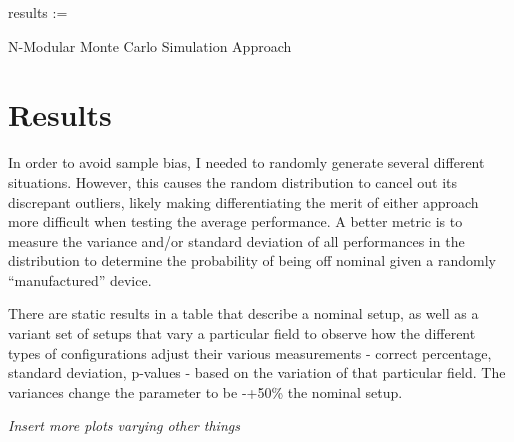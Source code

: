 \documentclass[article]{IEEEtran}
\begin{document}
\begin{algorithm}
    results := 
    \caption{N-Modular Monte Carlo Simulation Approach}
\end{algorithm}

\section{Results}
In order to avoid sample bias, I needed to randomly generate several different situations. However, this causes the random distribution to cancel out its discrepant outliers, likely making differentiating the merit of either approach more difficult when testing the average performance. A better metric is to measure the variance and/or standard deviation of all performances in the distribution to determine the probability of being off nominal given a randomly “manufactured” device.
\par
There are static results in a table that describe a nominal setup, as well as a variant set of setups that vary a particular field to observe how the different types of configurations adjust their various measurements - correct percentage, standard deviation, p-values - based on the variation of that particular field. The variances change the parameter to be -+50\% the nominal setup.





\textit{Insert more plots varying other things}
\end{document}
